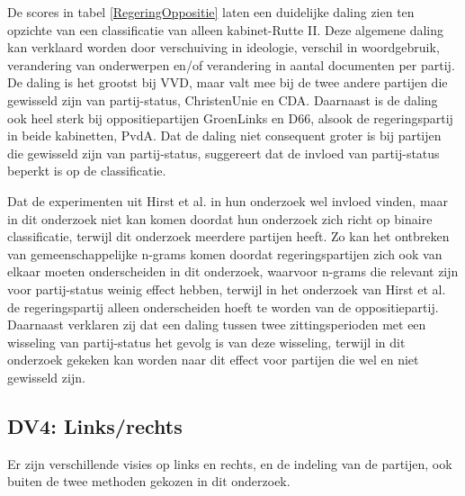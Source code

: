 De scores in tabel \ref{RegeringOppositie} laten een duidelijke daling zien ten opzichte van een classificatie van alleen kabinet-Rutte II. Deze algemene daling kan verklaard worden door verschuiving in ideologie, verschil in woordgebruik, verandering van onderwerpen en/of verandering in aantal documenten per partij. De daling is het grootst bij VVD, maar valt mee bij de twee andere partijen die gewisseld zijn van partij-status, ChristenUnie en CDA. Daarnaast is de daling ook heel sterk bij oppositiepartijen GroenLinks en D66, alsook de regeringspartij in beide kabinetten, PvdA. Dat de daling niet consequent groter is bij partijen die gewisseld zijn van partij-status, suggereert dat de invloed van partij-status beperkt is op de classificatie.\par
Dat de experimenten uit Hirst et al. in hun onderzoek wel invloed vinden, maar in dit onderzoek niet kan komen doordat hun onderzoek zich richt op binaire classificatie, terwijl dit onderzoek meerdere partijen heeft. Zo kan het ontbreken van gemeenschappelijke n-grams komen doordat regeringspartijen zich ook van elkaar moeten onderscheiden in dit onderzoek, waarvoor n-grams die relevant zijn voor partij-status weinig effect hebben, terwijl in het onderzoek van Hirst et al. de regeringspartij alleen onderscheiden hoeft te worden van de oppositiepartij. Daarnaast verklaren zij dat een daling tussen twee zittingsperioden met een wisseling van partij-status het gevolg is van deze wisseling, terwijl in dit onderzoek gekeken kan worden naar dit effect voor partijen die wel en niet gewisseld zijn.\par

\subsection{DV4: Links/rechts}
Er zijn verschillende visies op links en rechts, en de indeling van de partijen, ook buiten de twee methoden gekozen in dit onderzoek.\par

